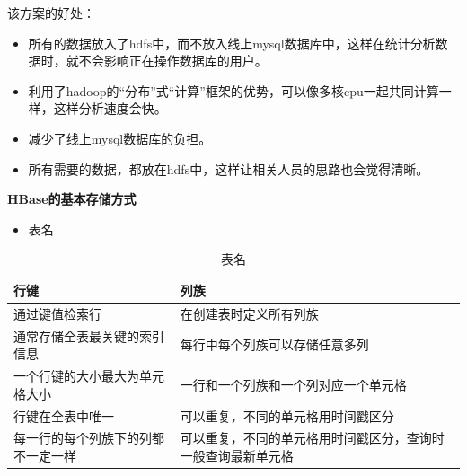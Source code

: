 该方案的好处：
\begin{itemize}
	\item 所有的数据放入了hdfs中，而不放入线上mysql数据库中，这样在统计分析数据时，就不会影响正在操作数据库的用户。
	\item 利用了hadoop的“分布”式“计算”框架的优势，可以像多核cpu一起共同计算一样，这样分析速度会快。
	\item 减少了线上mysql数据库的负担。
	\item 所有需要的数据，都放在hdfs中，这样让相关人员的思路也会觉得清晰。
\end{itemize}

\newpage
\textbf{HBase的基本存储方式}
\begin{itemize}
\item 表名
\end{itemize}

\begin{table}[!htbp]
	\centering
	\caption{表名}
	\label{tab:my-table}
	\begin{tabular}{|p{3cm}|p{10cm}|}
		\hline
		\rowcolor[HTML]{DAE8FC} 
		行键 & 列族 \\ \hline
		通过键值检索行 & 在创建表时定义所有列族  \\ \hline
		通常存储全表最关键的索引信息 & 每行中每个列族可以存储任意多列 \\ \hline
		一个行键的大小最大为单元格大小 & 一行和一个列族和一个列对应一个单元格 \\ \hline
        行键在全表中唯一 & 可以重复，不同的单元格用时间戳区分 \\ \hline
        每一行的每个列族下的列都不一定一样 & 可以重复，不同的单元格用时间戳区分，查询时一般查询最新单元格 \\ \hline
	\end{tabular}
\end{table}



